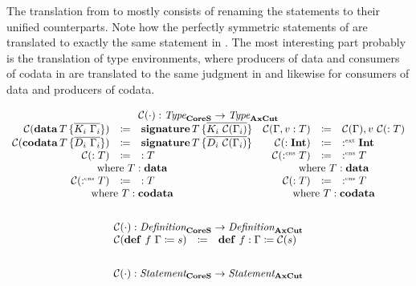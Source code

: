 The translation from \targetsub{} to \machinelang{} mostly consists of renaming the statements to their unified counterparts.
Note how the perfectly symmetric statements of \targetsub{} are translated to exactly the same statement in \machinelang.
The most interesting part probably is the translation of type environments, where producers of data and consumers of codata in \targetsub{} are translated to the same judgment in \machinelang{} and likewise for consumers of data and producers of codata.

\begin{gather*}
  \begin{array}{rclrcl}
    \multicolumn{6}{c}{\collapse{\cdot} : \emph{Type}_{\targetsub{}} \rightarrow \emph{Type}_{\machinelang{}}}\\
    \collapse{\data{T}{\overline{K_i\ \Gamma_i}}}{} & \coloneq & \sig{T}{\overline{K_i\ \collapse{\Gamma_i}}} &
    \collapse{\Gamma, v : T}{} & \coloneq & \collapse{\Gamma}{}, v\ \collapse{: T} \\
    \collapse{\codata{T}{\overline{D_i\ \Gamma_i}}}{} & \coloneq & \sig{T}{\overline{D_i\ \collapse{\Gamma_i}}} &
    \collapse{: \tyint} & \coloneq & \ext \tyint \\
    \collapse{: T} & \coloneq & : T &
    \collapse{\cnt T} & \coloneq & \cnt T \\
    \multicolumn{3}{c}{\text{where } T : \mathbf{data}} &
    \multicolumn{3}{c}{\text{where } T : \mathbf{data}} \\
    \collapse{\cnt T} & \coloneq & : T &
    \collapse{: T} & \coloneq & \cnt T \\
    \multicolumn{3}{c}{\text{where } T : \mathbf{codata}} &
    \multicolumn{3}{c}{\text{where } T : \mathbf{codata}} \\
  \end{array}
  \\\\
  \begin{array}{rcl}
    \multicolumn{3}{c}{\collapse{\cdot} : \emph{Definition}_{\targetsub{}} \rightarrow \emph{Definition}_{\machinelang{}}}\\
    \collapse{\defi{f\ \Gamma}{s}} & \coloneq & \defi{f : \Gamma}{\collapse{s}} \\
  \end{array}
  \\\\
  \begin{array}{rclrcl}
    \multicolumn{6}{c}{\collapse{\cdot} : \emph{Statement}_{\targetsub{}} \rightarrow \emph{Statement}_{\machinelang{}}}\\

\end{array}
\end{gather*}
